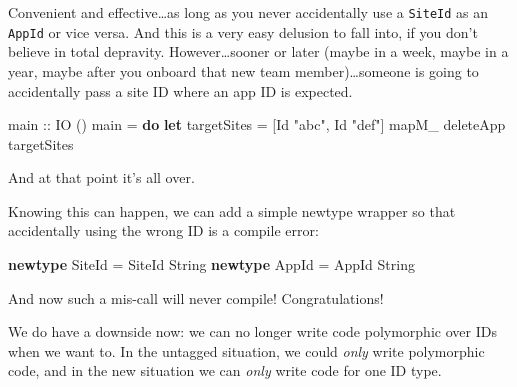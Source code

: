 \documentclass[]{article}
\newenvironment{Shaded}{}{}
\newcommand{\DataTypeTok}[1]{\textcolor[rgb]{0.56,0.13,0.00}{#1}}
\newcommand{\FunctionTok}[1]{\textcolor[rgb]{0.02,0.16,0.49}{#1}}
\newcommand{\KeywordTok}[1]{\textcolor[rgb]{0.00,0.44,0.13}{\textbf{#1}}}
\newcommand{\NormalTok}[1]{#1}
\newcommand{\OtherTok}[1]{\textcolor[rgb]{0.00,0.44,0.13}{#1}}
\newcommand{\StringTok}[1]{\textcolor[rgb]{0.25,0.44,0.63}{#1}}
\begin{document}
Convenient and effective\ldots as long as you never accidentally use a
\texttt{SiteId} as an \texttt{AppId} or vice versa. And this is a very easy
delusion to fall into, if you don't believe in total depravity.
However\ldots sooner or later (maybe in a week, maybe in a year, maybe after you
onboard that new team member)\ldots someone is going to accidentally pass a site
ID where an app ID is expected.

\begin{Shaded}
\begin{Highlighting}[]
\OtherTok{main ::} \DataTypeTok{IO}\NormalTok{ ()}
\NormalTok{main }\OtherTok{=} \KeywordTok{do}
    \KeywordTok{let}\NormalTok{ targetSites }\OtherTok{=}\NormalTok{ [}\DataTypeTok{Id} \StringTok{"abc"}\NormalTok{, }\DataTypeTok{Id} \StringTok{"def"}\NormalTok{]}
    \FunctionTok{mapM\_}\NormalTok{ deleteApp targetSites}
\end{Highlighting}
\end{Shaded}

And at that point it's all over.

Knowing this can happen, we can add a simple newtype wrapper so that
accidentally using the wrong ID is a compile error:

\begin{Shaded}
\begin{Highlighting}[]
\KeywordTok{newtype} \DataTypeTok{SiteId} \OtherTok{=} \DataTypeTok{SiteId} \DataTypeTok{String}
\KeywordTok{newtype} \DataTypeTok{AppId} \OtherTok{=} \DataTypeTok{AppId} \DataTypeTok{String}
\end{Highlighting}
\end{Shaded}

And now such a mis-call will never compile! Congratulations!

We do have a downside now: we can no longer write code polymorphic over IDs when
we want to. In the untagged situation, we could \emph{only} write polymorphic
code, and in the new situation we can \emph{only} write code for one ID type.
\end{document}
